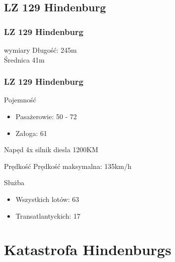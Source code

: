 \documentclass{beamer}
\begin{document}
\subsection{LZ 129 Hindenburg}
\begin{frame}
	\frametitle{LZ 129 Hindenburg}
	\begin{block}{wymiary}
	Długość: 245m\\
	Średnica 41m
	\end{block}
\end{frame}
\begin{frame}
	\frametitle{LZ 129 Hindenburg}
	\begin{block}{Pojemność}
		\begin{itemize}
			\item Pasażerowie: 50 - 72
			\item Załoga: 61
		\end{itemize}
	\end{block}
	\begin{block}{Napęd}
		4x silnik diesla 1200KM
	\end{block}
	\begin{block}{Prędkość}
		Prędkość maksymalna: 135km/h
	\end{block}
	\begin{block}{Służba}
		\begin{itemize}
		\item Wszystkich lotów: 63
		\item Transatlantyckich: 17
		\end{itemize}
	\end{block}
\end{frame}
\section{Katastrofa Hindenburgs}
\end{document}
